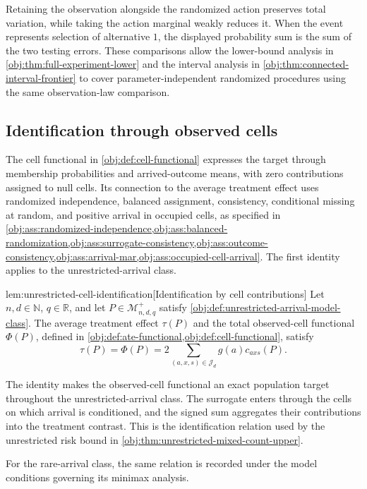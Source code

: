 Retaining the observation alongside the randomized action preserves total variation, while taking the action marginal weakly reduces it. When the event represents selection of alternative \(1\), the displayed probability sum is the sum of the two testing errors. These comparisons allow the lower-bound analysis in \cref{obj:thm:full-experiment-lower} and the interval analysis in \cref{obj:thm:connected-interval-frontier} to cover parameter-independent randomized procedures using the same observation-law comparison.

\subsection{Identification through observed cells}

The cell functional in \cref{obj:def:cell-functional} expresses the target through membership probabilities and arrived-outcome means, with zero contributions assigned to null cells. Its connection to the average treatment effect uses randomized independence, balanced assignment, consistency, conditional missing at random, and positive arrival in occupied cells, as specified in \cref{obj:ass:randomized-independence,obj:ass:balanced-randomization,obj:ass:surrogate-consistency,obj:ass:outcome-consistency,obj:ass:arrival-mar,obj:ass:occupied-cell-arrival}. The first identity applies to the unrestricted-arrival class.

\begin{lemmav}{lem:unrestricted-cell-identification}[Identification by cell contributions]
Let \(n,d\in\mathbb N\), \(q\in\mathbb R\), and let \(P\in\mathcal M^{+}_{n,d,q}\) satisfy \cref{obj:def:unrestricted-arrival-model-class}. The average treatment effect \(\tau(P)\) and the total observed-cell functional \(\Phi(P)\), defined in \cref{obj:def:ate-functional,obj:def:cell-functional}, satisfy
\[
\tau(P)=\Phi(P)
=2\sum_{(a,x,s)\in\mathcal J_d}g(a)c_{axs}(P).
\]
\end{lemmav}

The identity makes the observed-cell functional an exact population target throughout the unrestricted-arrival class. The surrogate enters through the cells on which arrival is conditioned, and the signed sum aggregates their contributions into the treatment contrast. This is the identification relation used by the unrestricted risk bound in \cref{obj:thm:unrestricted-mixed-count-upper}.

For the rare-arrival class, the same relation is recorded under the model conditions governing its minimax analysis.

